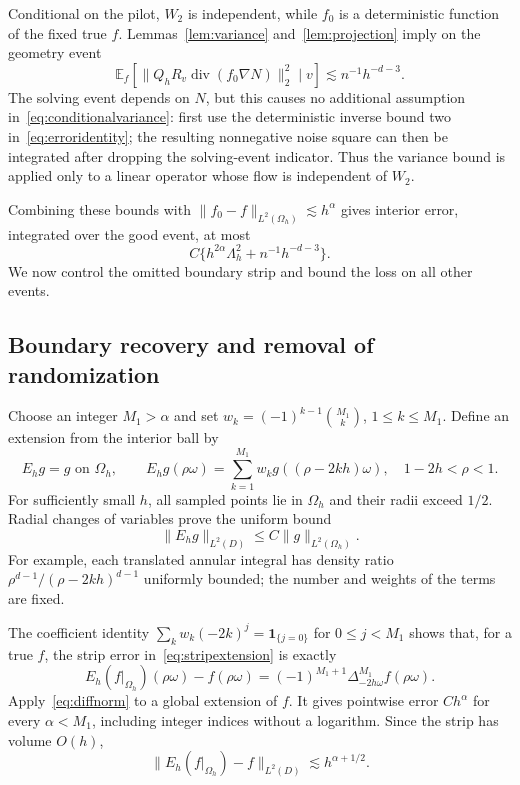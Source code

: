 \documentclass[11pt]{article}
\theoremstyle{remark}
\newcommand{\E}{\mathbb E}
\newcommand{\diver}{\operatorname{div}}
\newcommand{\norm}[1]{\lVert #1\rVert}
\begin{document}
Conditional on the pilot, $W_2$ is independent, while $f_0$ is a deterministic function of the fixed true $f$. Lemmas~\ref{lem:variance} and~\ref{lem:projection} imply on the geometry event
\begin{equation}\label{eq:conditionalvariance}
 \E_f\left[\norm{Q_hR_v\diver(f_0\nabla N)}_2^2\mid v\right]
 \lesssim n^{-1}h^{-d-3}.
\end{equation}
The solving event depends on $N$, but this causes no additional assumption in~\eqref{eq:conditionalvariance}: first use the deterministic inverse bound two in~\eqref{eq:erroridentity}; the resulting nonnegative noise square can then be integrated after dropping the solving-event indicator.  Thus the variance bound is applied only to a linear operator whose flow is independent of $W_2$.

Combining these bounds with $\norm{f_0-f}_{L^2(\Omega_h)}\lesssim h^\alpha$ gives interior error, integrated over the good event, at most
\begin{equation}\label{eq:interiorrisk}
 C\{h^{2\alpha}\Lambda_h^2+n^{-1}h^{-d-3}\}.
\end{equation}
We now control the omitted boundary strip and bound the loss on all other events.

\subsection{Boundary recovery and removal of randomization}
Choose an integer $M_1>\alpha$ and set
$w_k=(-1)^{k-1}\binom{M_1}{k}$, $1\le k\le M_1$. Define an extension from the interior ball by
\begin{equation}\label{eq:stripextension}
 E_hg=g\text{ on }\Omega_h,\qquad
 E_hg(\rho\omega)=\sum_{k=1}^{M_1}w_kg((\rho-2kh)\omega),
 \quad1-2h<\rho<1.
\end{equation}
For sufficiently small $h$, all sampled points lie in $\Omega_h$ and their radii exceed $1/2$. Radial changes of variables prove the uniform bound
\begin{equation}\label{eq:stripL2}
 \norm{E_hg}_{L^2(D)}\le C\norm g_{L^2(\Omega_h)}.
\end{equation}
For example, each translated annular integral has density ratio
$\rho^{d-1}/(\rho-2kh)^{d-1}$ uniformly bounded; the number and weights of the terms are fixed.

The coefficient identity
$\sum_kw_k(-2k)^j=\mathbf1_{\{j=0\}}$ for $0\le j<M_1$
shows that, for a true $f$, the strip error in~\eqref{eq:stripextension} is exactly
\[
 E_h(f|_{\Omega_h})(\rho\omega)-f(\rho\omega)
 =(-1)^{M_1+1}\Delta_{-2h\omega}^{M_1}f(\rho\omega).
\]
Apply~\eqref{eq:diffnorm} to a global extension of $f$. It gives pointwise error $Ch^\alpha$ for every $\alpha<M_1$, including integer indices without a logarithm. Since the strip has volume $O(h)$,
\begin{equation}\label{eq:stripbias}
 \norm{E_h(f|_{\Omega_h})-f}_{L^2(D)}\lesssim h^{\alpha+1/2}.
\end{equation}
\end{document}

